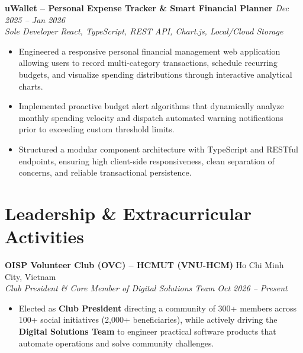 \documentclass[11pt,a4paper]{article}
\begin{document}
\vspace{3pt}
\noindent
\textbf{uWallet -- Personal Expense Tracker \& Smart Financial Planner} \hfill \textit{Dec 2025 -- Jan 2026} \\
\textit{Sole Developer} \hfill \textit{React, TypeScript, REST API, Chart.js, Local/Cloud Storage}
\begin{itemize}
    \item Engineered a responsive personal financial management web application allowing users to record multi-category transactions, schedule recurring budgets, and visualize spending distributions through interactive analytical charts.
    \item Implemented proactive budget alert algorithms that dynamically analyze monthly spending velocity and dispatch automated warning notifications prior to exceeding custom threshold limits.
    \item Structured a modular component architecture with TypeScript and RESTful endpoints, ensuring high client-side responsiveness, clean separation of concerns, and reliable transactional persistence.
\end{itemize}

\vspace{1pt}

\section*{Leadership \& Extracurricular Activities}
\noindent
\textbf{OISP Volunteer Club (OVC) -- HCMUT (VNU-HCM)} \hfill Ho Chi Minh City, Vietnam \\
\textit{Club President \& Core Member of Digital Solutions Team} \hfill \textit{Oct 2026 -- Present}
\begin{itemize}
    \item Elected as \textbf{Club President} directing a community of 300+ members across 100+ social initiatives (2,000+ beneficiaries), while actively driving the \textbf{Digital Solutions Team} to engineer practical software products that automate operations and solve community challenges.
\end{itemize}
\end{document}
